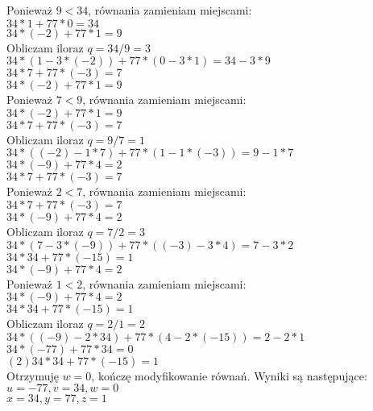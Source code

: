 \documentclass[answers,11pt]{exam}
\begin{document}
\begin{questions}
\begin{solution}
Ponieważ $9 < 34$, równania zamieniam miejscami:\\
$ 34 * 1 + 77 * 0 = 34$\\
$ 34 * (-2) + 77 * 1 = 9$\\

Obliczam iloraz $q = 34 / 9 = 3$\\
$ 34 * (1 - 3 * (-2)) + 77 * (0 - 3 * 1) = 34  - 3 * 9$\\
$ 34 * 7 + 77 * (-3) = 7$\\
$ 34 * (-2) + 77 * 1 = 9$\\

Ponieważ $7 < 9$, równania zamieniam miejscami:\\
$ 34 * (-2) + 77 * 1 = 9$\\
$ 34 * 7 + 77 * (-3) = 7$\\

Obliczam iloraz $q = 9 / 7 = 1$\\
$ 34 * ((-2) - 1 * 7) + 77 * (1 - 1 * (-3)) = 9 - 1 * 7$\\
$ 34 * (-9) + 77 * 4 = 2$\\
$ 34 * 7 + 77 * (-3) = 7$\\

Ponieważ $2 < 7$, równania zamieniam miejscami:\\
$ 34 * 7 + 77 * (-3) = 7$\\
$ 34 * (-9) + 77 * 4 = 2$\\

Obliczam iloraz $q = 7 / 2 = 3$\\
$ 34 * (7 - 3 * (-9)) + 77 * ((-3) - 3 * 4) = 7 - 3 * 2$\\
$ 34 * 34 + 77 * (-15) = 1$\\
$ 34 * (-9) + 77 * 4 = 2$\\
Ponieważ $1 < 2$, równania zamieniam miejscami:\\
$ 34 * (-9) + 77 * 4 = 2$\\
$ 34 * 34 + 77 * (-15) = 1$\\

Obliczam iloraz $q = 2 / 1 = 2$\\
$ 34 * ((-9) - 2 * 34)  + 77 * (4 - 2 * (-15)) = 2 - 2 * 1$\\
$ 34 * (-77) + 77 * 34 = 0$\\
$(2) 34 * 34 + 77 * (-15) = 1$\\

Otrzymuję $w = 0$, kończę modyfikowanie równań. Wyniki są następujące:\\
$u = -77,  v = 34,  w = 0$\\
$x = 34, y = 77,  z = 1$\\


\end{solution}
\end{questions}
\end{document}
